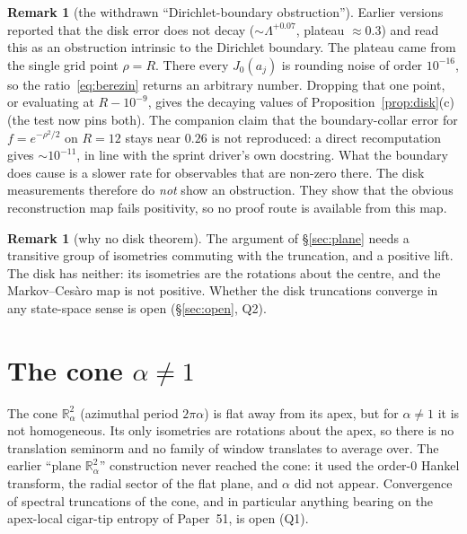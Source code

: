\documentclass[11pt,a4paper]{article}
\theoremstyle{plain}
\theoremstyle{definition}
\newtheorem{remark}[theorem]{Remark}
\newcommand{\R}{\mathbb{R}}
\begin{document}
\begin{remark}[the withdrawn ``Dirichlet-boundary obstruction'']
\label{rem:interior_correction}
Earlier versions reported that the disk error does not decay
($\sim\Lambda^{+0.07}$, plateau $\approx0.3$) and read this as an
obstruction intrinsic to the Dirichlet boundary. The plateau came from
the single grid point $\rho=R$. There every $J_{0}(a_{j})$ is rounding
noise of order $10^{-16}$, so the ratio~\eqref{eq:berezin} returns an
arbitrary number. Dropping that one point, or evaluating at $R-10^{-9}$,
gives the decaying values of Proposition~\ref{prop:disk}(c) (the test
now pins both). The companion claim that the boundary-collar error for
$f=e^{-\rho^{2}/2}$ on $R=12$ stays near $0.26$ is not reproduced: a
direct recomputation gives $\sim10^{-11}$, in line with the sprint
driver's own docstring. What the boundary does cause is a slower rate for
observables that are non-zero there. The disk measurements therefore do
\emph{not} show an obstruction. They show that the obvious reconstruction
map fails positivity, so no proof route is available from this map.
\end{remark}

\begin{remark}[why no disk theorem]
The argument of \S\ref{sec:plane} needs a transitive group of isometries
commuting with the truncation, and a positive lift. The disk has neither:
its isometries are the rotations about the centre, and the
Markov--Ces\`aro map is not positive. Whether the disk truncations
converge in any state-space sense is open (\S\ref{sec:open}, Q2).
\end{remark}

\section{The cone $\alpha\ne1$}
\label{sec:cone}
The cone $\R^{2}_{\alpha}$ (azimuthal period $2\pi\alpha$) is flat away
from its apex, but for $\alpha\ne1$ it is not homogeneous. Its only
isometries are rotations about the apex, so there is no translation
seminorm and no family of window translates to average over. The earlier
``plane $\R^{2}_{\alpha}$'' construction never reached the cone: it used
the order-$0$ Hankel transform, the radial sector of the flat plane, and
$\alpha$ did not appear. Convergence of spectral truncations of the cone,
and in particular anything bearing on the apex-local cigar-tip entropy of
Paper~51, is open (Q1).
\end{document}
